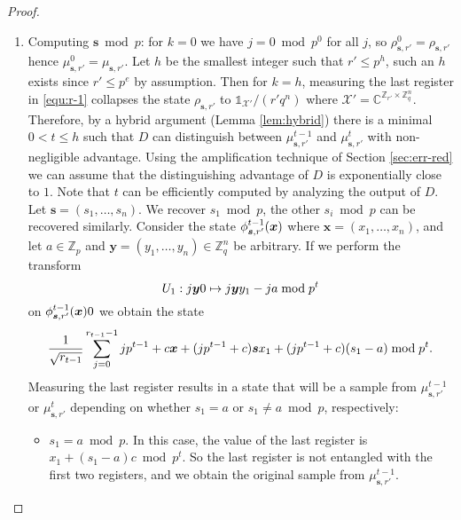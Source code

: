 \documentclass[11pt]{article}
\theoremstyle{plain}
\theoremstyle{definition}
\let\ket\relax
\DeclarePairedDelimiter{\ket}{\lvert}{\rangle}
\def\C{\mathbb{C}}
\def\Z{\mathbb{Z}}
\def\X{\mathcal{X}}
\begin{document}
\begin{proof}
\begin{enumerate}[leftmargin = *, font = \bfseries]
    \item\label{step:s-mod-p} Computing $\bm{s} \bmod p$: for $k = 0$ we have $j = 0 \bmod p^0$ for all $j$, so $\rho_{\bm{s}, r'}^0 = \rho_{\bm{s}, r'}$ hence $\mu_{\bm{s}, r'}^0 = \mu_{\bm{s}, r'}$. Let $h$ be the smallest integer such that $r' \le p^h$, such an $h$ exists since $r' \le p^e$ by assumption. Then for $k = h$, measuring the last register in \eqref{equ:r-1} collapses the state $\rho_{\bm{s}, r'}$ to $\mathds{1}_{\X'} / (r'q^n)$ where $\X' = \C^{\Z_{r'} \times \Z_q^n}$. Therefore, by a hybrid argument (Lemma \ref{lem:hybrid}) there is a minimal $0 < t \le h$ such that $D$ can distinguish between $\mu_{\bm{s}, r'}^{t - 1}$ and $\mu_{\bm{s}, r'}^t$ with non-negligible advantage. Using the amplification technique of Section \ref{sec:err-red} we can assume that the distinguishing advantage of $D$ is exponentially close to $1$. Note that $t$ can be efficiently computed by analyzing the output of $D$. Let $\bm{s} = (s_1, \dots, s_n)$. We recover $s_1 \bmod p$, the other $s_i \bmod p$ can be recovered similarly. Consider the state $\ket{\phi_{\bm{s}, r'}^{t - 1}(\bm{x})}$ where $\bm{x} = (x_1, \dots, x_n)$, and let $a \in \Z_p$ and $\bm{y} = (y_1, \dots, y_n) \in \Z_q^n$ be arbitrary. If we perform the transform
    \begin{equation}
        \label{equ:s1-trans}
        U_1: \ket{j}\ket{\bm{y}}\ket{0} \mapsto \ket{j}\ket{\bm{y}}\ket{y_1 - ja \bmod p^t}
    \end{equation}
    on $\ket{\phi_{\bm{s}, r'}^{t - 1}(\bm{x})}\ket{0}$ we obtain the state
    \[ \frac{1}{\sqrt{r_{t - 1}}} \sum_{j = 0}^{r_{t - 1} - 1} \ket{jp^{t - 1} + c}\ket{\bm{x} + (jp^{t - 1} + c)\bm{s}}\ket{x_1 + (jp^{t - 1} + c)(s_1 - a) \bmod p^t}. \]
    Measuring the last register results in a state that will be a sample from $\mu_{\bm{s}, r'}^{t - 1}$ or $\mu_{\bm{s}, r'}^t$ depending on whether $s_1 = a$ or $s_1 \ne a \bmod p$, respectively:
    \begin{itemize}
    \item $s_1 = a \bmod p$. In this case, the value of the last register is $x_1 + (s_1 - a)c \bmod p^t$. So the last register is not entangled with the first two registers, and we obtain the original sample from $\mu_{\bm{s}, r'}^{t - 1}$.
        

\end{itemize}
\end{enumerate}
\end{proof}
\end{document}
